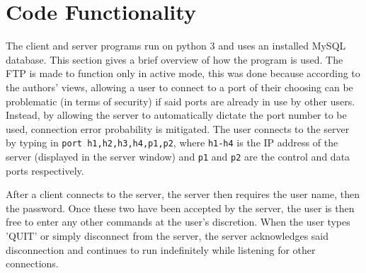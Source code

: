 \documentclass[journal, a4paper]{IEEEtran}
\begin{document}
\section{Code Functionality}
The client and server programs run on python 3 and uses an installed MySQL database. This section gives a brief overview of how the program is used.
The FTP is made to function only in active mode, this was done because according to the authors’ views, allowing a user to connect to a port of their choosing can be problematic (in terms of security) if said ports are already in use by other users. Instead, by allowing the server to automatically dictate the port number to be used, connection error probability is mitigated. The user connects to the server by typing in \texttt{port h1,h2,h3,h4,p1,p2}, where \texttt{h1-h4} is the IP address of the server (displayed in the server window) and \texttt{p1} and \texttt{p2} are the control and data ports respectively.

After a client connects to the server, the server then requires the user name, then the password. Once these two have been accepted by the server, the user is then free to enter any other commands at the user's discretion. When the user types 'QUIT' or simply disconnect from the server, the server acknowledges said disconnection and continues to run indefinitely while listening for other connections.
\end{document}
